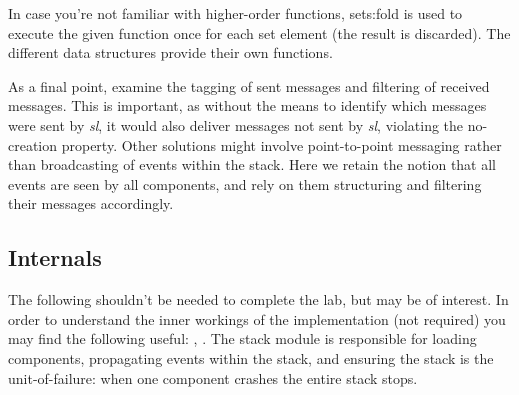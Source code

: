 \documentclass[a4paper]{article}
\begin{document}
In case you're not familiar with higher-order functions, sets:fold is used to
execute the given function once for each set element (the result is
discarded). The different data structures provide their own functions.

As a final point, examine the tagging of sent messages and filtering of
received messages. This is important, as without the means to identify which
messages were sent by \emph{sl}, it would also deliver messages not sent by \emph{sl},
violating the no-creation property. Other solutions might involve
point-to-point messaging rather than broadcasting of events within the stack.
Here we retain the notion that all events are seen by all components, and
rely on them structuring and filtering their messages accordingly.

%




\subsection{Internals} %
\label{sub:internals}

The following shouldn't be needed to complete the lab, but may be of interest.
In order to understand the inner workings of the implementation (not required)
you may find the following useful: \cite{man_gen_server},
\cite{lyse_client_server}. The stack module is responsible for loading
components, propagating events within the stack, and ensuring the stack is the
unit-of-failure: when one component crashes the entire stack stops.
\end{document}
